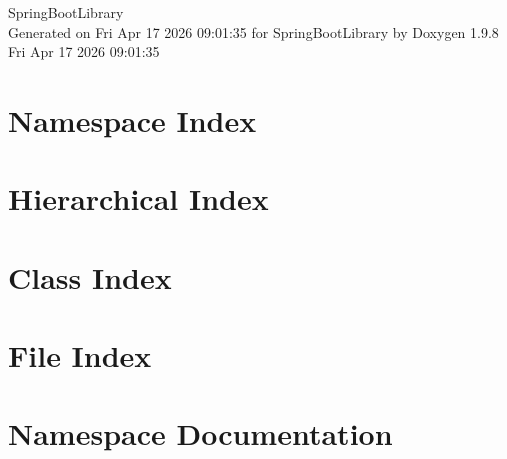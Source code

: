 \documentclass[twoside]{book}
\newcommand{\+}{\discretionary{\mbox{\scriptsize$\hookleftarrow$}}{}{}}
\newcommand{\clearemptydoublepage}{%
    \newpage{\pagestyle{empty}\cleardoublepage}%
  }
\begin{document}
  \raggedbottom
    \hypersetup{pageanchor=false,
                bookmarksnumbered=true,
                pdfencoding=unicode
               }
  \begin{titlepage}
  \vspace*{7cm}
  \begin{center}%
  {\Large Spring\+Boot\+Library}\\
  \vspace*{1cm}
  {\large Generated on Fri Apr 17 2026 09\+:01\+:35 for Spring\+Boot\+Library by Doxygen 1.9.8}\\
    \vspace*{0.5cm}
    {\small Fri Apr 17 2026 09:01:35}
  \end{center}
  \end{titlepage}
  \clearemptydoublepage
  \tableofcontents
  \clearemptydoublepage
  \hypersetup{pageanchor=true}
\chapter{Namespace Index}

\chapter{Hierarchical Index}

\chapter{Class Index}

\chapter{File Index}

\chapter{Namespace Documentation}








\end{document}
